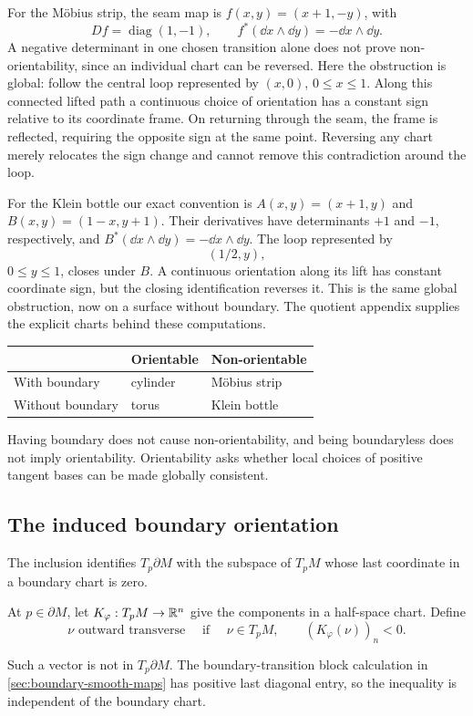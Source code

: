 For the M\"obius strip, the seam map is $f(x,y)=(x+1,-y)$, with
\[
Df=\operatorname{diag}(1,-1),\qquad
f^*(\dd x\wedge\dd y)=-\dd x\wedge\dd y.
\]
A negative determinant in one chosen transition alone does not prove
non-orientability, since an individual chart can be reversed.
Here the obstruction is global: follow the central loop represented by
$(x,0)$, $0\leq x\leq1$. Along this connected lifted path a continuous
choice of orientation has a constant sign relative to its coordinate
frame. On returning through the seam, the frame is reflected, requiring
the opposite sign at the same point. Reversing any chart merely relocates
the sign change and cannot remove this contradiction around the loop.

For the Klein bottle our exact convention is
$A(x,y)=(x+1,y)$ and $B(x,y)=(1-x,y+1)$.
Their derivatives have determinants $+1$ and $-1$, respectively, and
$B^*(\dd x\wedge\dd y)=-\dd x\wedge\dd y$.
The loop represented by
\[
(1/2,y),
\]
 $0\leq y\leq1$, closes under $B$.
A continuous orientation along its lift has constant coordinate sign,
but the closing identification reverses it. This is the same global
obstruction, now on a surface without boundary. The quotient appendix
supplies the explicit charts behind these computations.

\begin{center}
\begin{tabular}{l l l}
 & Orientable & Non-orientable\\\hline
With boundary & cylinder & M\"obius strip\\
Without boundary & torus & Klein bottle
\end{tabular}
\end{center}
Having boundary does not cause non-orientability, and being boundaryless
does not imply orientability. Orientability asks whether local choices
of positive tangent bases can be made globally consistent.

\subsection{The induced boundary orientation}
The inclusion identifies $T_p\partial M$ with the subspace of $T_pM$
whose last coordinate in a boundary chart is zero.
\begin{definition}
At $p\in\partial M$, let $K_\varphi:T_pM\to\mathbb{R}^n$ give the
components in a half-space chart. Define
\[
\nu\text{ outward transverse}\quad\text{ if }\quad
\nu\in T_pM,\qquad (K_\varphi(\nu))_n<0.
\]
\end{definition}
Such a vector is not in $T_p\partial M$. The boundary-transition block
calculation in \cref{sec:boundary-smooth-maps} has positive last diagonal
entry, so the inequality is independent of the boundary chart.


